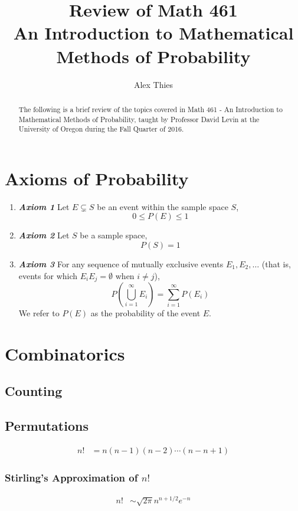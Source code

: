 \documentclass{amsproc}
\title{Review of Math 461 \\ An Introduction to Mathematical Methods of Probability}
\author{Alex Thies}
\begin{document}
	\begin{abstract}
		The following is a brief review of the topics covered in Math 461 - An Introduction to Mathematical Methods of Probability, taught by Professor David Levin at the University of Oregon during the Fall Quarter of 2016.
	\end{abstract}
	\maketitle
	\tableofcontents
	\newpage

	\section{Axioms of Probability}
		\begin{enumerate}
			\item \textbf{\textit{Axiom 1}} Let $E \subsetneq S$ be an event within the sample space $S$, \[0 \leq P(E) \leq 1\]

			\item \textbf{\textit{Axiom 2}} Let $S$ be a sample space, \[P(S) = 1\]

			\item \textbf{\textit{Axiom 3}} For any sequence of mutually exclusive events $E_{1}, E_{2}, \dots$ (that is, events for which $E_{i}E_{j} = \emptyset$ when $i \neq j$), \[P \left( \bigcup\limits_{i=1}^{\infty} E_{i} \right) = \sum\limits_{i=1}^{\infty} P\left( E_{i} \right)\] We refer to $P(E)$ as the probability of the event $E$.
		\end{enumerate}

	\section{Combinatorics}
		\subsection{Counting}

		\subsection{Permutations}
			\begin{align*}
				n! &= n(n-1)(n-2)\cdots(n-n+1)
			\end{align*}

			\subsubsection{Stirling's Approximation of $n!$}
				\begin{align*}
					n! &\sim \sqrt{2\pi} n^{n + 1/2} e^{-n}
				\end{align*}
\end{document}
